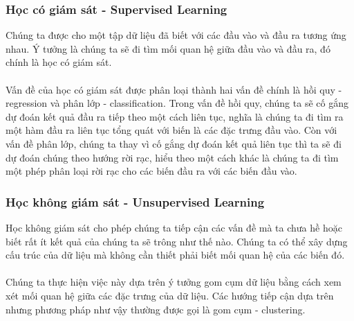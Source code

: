 \subsubsection{Học có giám sát - Supervised Learning}
Chúng ta được cho một tập dữ liệu đã biết với các đầu vào và đầu ra tương ứng
nhau. Ý tưởng là chúng ta sẽ đi tìm mối quan hệ giữa đầu vào và đầu ra, đó 
chính là học có giám sát.\\\\
Vấn đề của học có giám sát được phân loại thành hai
vấn đề chính là hồi quy - regression và phân lớp - classification. Trong vấn đề 
hồi quy, chúng ta sẽ cố gắng dự đoán kết quả đầu ra tiếp theo một cách liên tục, 
nghĩa là chúng ta đi tìm ra một hàm đầu ra liên tục tổng quát với biến là các 
đặc trưng đầu vào. Còn với vấn đề phân lớp, chúng ta thay vì cố gắng dự đoán kết
quả liên tục thì ta sẽ đi dự đoán chúng theo hướng rời rạc, hiểu theo một cách
khác là chúng ta đi tìm một phép phân loại rời rạc cho các biến đầu ra với các 
biến đầu vào.
\subsubsection{Học không giám sát - Unsupervised Learning}
Học không giám sát cho phép chúng ta tiếp cận các vấn đề mà ta chưa hề hoặc biết
rất ít kết quả của chúng ta sẽ trông như thế nào. Chúng ta có thể xây dựng cấu
trúc của dữ liệu mà không cần thiết phải biết mối quan hệ của các biến đó.\\\\
Chúng ta thực hiện việc này dựa trên ý tưởng gom cụm dữ liệu bằng cách xem xét
mối quan hệ giữa các đặc trưng của dữ liệu. Các hướng tiếp cận dựa trên nhưng 
phương pháp như vậy thường được gọi là gom cụm - clustering.

